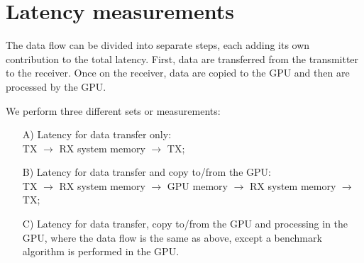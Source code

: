 \documentclass[journal]{IEEEtran}
\begin{document}
\section{Latency measurements}
The data flow can be divided into separate steps, each adding its own 
contribution to the total latency. First, data are transferred from the 
transmitter to the receiver. Once on the receiver, data
are copied to the GPU and then are processed by the GPU. 

We perform three different sets or measurements:
\begin{enumerate}
\item[A)] Latency for data transfer only:\\
TX $\to$ RX system memory $\to$ TX;
\item[B)] Latency for data transfer and copy to/from the GPU:\\
TX $\to$ RX system memory $\to$ GPU memory $\to$ RX system memory $\to$ TX;
\item[C)] Latency for data transfer, copy to/from the GPU and processing  
in the GPU, where the data flow is the same as above, except a benchmark algorithm is performed in the GPU.
\end{enumerate}
\end{document}
